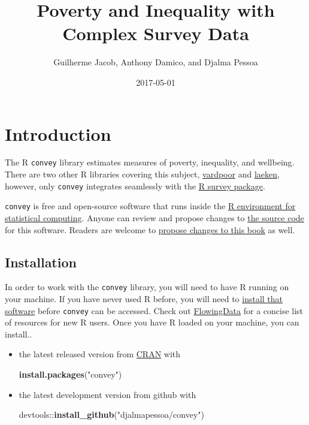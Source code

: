 \documentclass[]{book}
\title{Poverty and Inequality with Complex Survey Data}
\author{Guilherme Jacob, Anthony Damico, and Djalma Pessoa}
\date{2017-05-01}
\newenvironment{Shaded}{\begin{snugshade}}{\end{snugshade}}
\newcommand{\KeywordTok}[1]{\textcolor[rgb]{0.13,0.29,0.53}{\textbf{{#1}}}}
\newcommand{\StringTok}[1]{\textcolor[rgb]{0.31,0.60,0.02}{{#1}}}
\newcommand{\NormalTok}[1]{{#1}}
\begin{document}
\maketitle

{
\setcounter{tocdepth}{1}
\tableofcontents
}
\chapter{Introduction}\label{introduction}

The R \texttt{convey} library estimates measures of poverty, inequality,
and wellbeing. There are two other R libraries covering this subject,
\href{https://CRAN.R-project.org/package=vardpoor}{vardpoor} and
\href{https://CRAN.R-project.org/package=laeken}{laeken}, however, only
\texttt{convey} integrates seamlessly with the
\href{https://CRAN.R-project.org/package=survey}{R survey package}.

\texttt{convey} is free and open-source software that runs inside the
\href{https://www.r-project.org/}{R environment for statistical
computing}. Anyone can review and propose changes to
\href{https://github.com/DjalmaPessoa/convey}{the source code} for this
software. Readers are welcome to
\href{https://github.com/guilhermejacob/context/}{propose changes to
this book} as well.

\section{Installation}\label{install}

In order to work with the \texttt{convey} library, you will need to have
R running on your machine. If you have never used R before, you will
need to \href{https://www.r-project.org/}{install that software} before
\texttt{convey} can be accessed. Check out
\href{http://flowingdata.com/2012/06/04/resources-for-getting-started-with-r/}{FlowingData}
for a concise list of resources for new R users. Once you have R loaded
on your machine, you can install..

\begin{itemize}
\item
  the latest released version from
  \href{https://CRAN.R-project.org/package=convey}{CRAN} with

\begin{Shaded}
\begin{Highlighting}[]
\KeywordTok{install.packages}\NormalTok{(}\StringTok{"convey"}\NormalTok{)}
\end{Highlighting}
\end{Shaded}
\item
  the latest development version from github with

\begin{Shaded}
\begin{Highlighting}[]
\NormalTok{devtools::}\KeywordTok{install_github}\NormalTok{(}\StringTok{"djalmapessoa/convey"}\NormalTok{)}
\end{Highlighting}
\end{Shaded}
\end{itemize}
\end{document}
